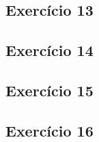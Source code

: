 \subsection{Exercício 13}\label{sec:exer13}

\subsection{Exercício 14}\label{sec:exer14}

\subsection{Exercício 15}\label{sec:exer15}

\subsection{Exercício 16}\label{sec:exer16}
